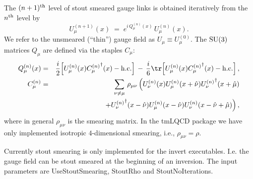 The $(n+1)^{\rm th}$ level of stout smeared gauge links is obtained iteratively
from the $n^{\rm th}$ level by
\begin{equation*}
  U_\mu^{(n+1)}(x)\;=\;e^{i\,Q_\mu^{(n)}(x)}\,U_\mu^{(n)}(x).
\end{equation*}
We refer to the unsmeared (``thin'') gauge field as $U_\mu\equiv
U_\mu^{(0)}$.
The ${\rm SU}(3)$ matrices $Q_\mu$ are defined via the staples $C_\mu$:
\begin{eqnarray}
  Q_\mu^{(n)}(x) &=& \frac{i}2\Big[U^{(n)}_\mu(x){C_\mu^{(n)}}^\dagger(x)
  - {\mathrm{h.c.}}\Big]\,-\,\frac{i}{6}\tr\Big[U^{(n)}_\mu(x){C_\mu^{(n)}}^\dagger(x)
  - {\mathrm{h.c.}}\Big]\,,\nonumber\\
  C_\mu^{(n)} &=& \sum_{\nu\neq\mu}\,\rho_{\mu\nu}\,
  \Big(U_\nu^{(n)}(x)U_\mu^{(n)}(x+\hat\nu){U_\nu^{(n)}}^\dagger(x+\hat\mu)
  \nonumber\\
  && \;\;\;
  +{U_\nu^{(n)}}^\dagger(x-\hat\nu)U_\mu^{(n)}(x-\hat\nu)U_\nu^{(n)}(x-\hat\nu+\hat\mu)
  \Big)\,,\nonumber
\end{eqnarray}
where in general $\rho_{\mu\nu}$ is the smearing matrix.
In the tmLQCD package we have only implemented isotropic $4$-dimensional
smearing, i.e., $\rho_{\mu\nu}=\rho$.

Currently stout smearing is only implemented for the {\ttfamily
  invert} executables. I.e. the gauge field can be stout smeared at
the beginning of an inversion. The input parameters are {\ttfamily
  UseStoutSmearing}, {\ttfamily StoutRho} and {\ttfamily
  StoutNoIterations}. 

